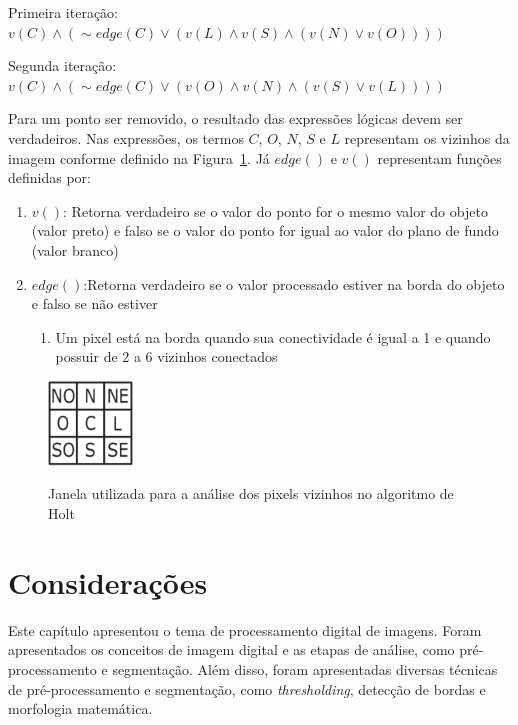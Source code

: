 \documentclass[12pt,oneside,a4paper,english,french,spanish,brazil,]{abntex2}
\begin{document}
Primeira iteração: 
\(v(C) \wedge (\sim edge(C) \vee (v(L) \wedge v(S) \wedge (v(N) \vee v(O))))\)

Segunda iteração:
\(v(C) \wedge (\sim edge(C) \vee (v(O) \wedge v(N) \wedge (v(S) \vee v(L))))\)

Para um ponto ser removido, o resultado das expressões lógicas devem ser verdadeiros. Nas expressões, os termos \(C\), \(O\), \(N\), \(S\) e \(L\) representam os vizinhos da imagem conforme definido na Figura~\ref{fig:PDI_Holt_1}. Já \(edge()\) e \(v()\) representam funções definidas por:
\begin{enumerate}
\item \(v()\): Retorna verdadeiro se o valor do ponto for o mesmo valor do objeto (valor preto) e falso se o valor do ponto for igual ao valor do plano de fundo (valor branco)
\item \(edge()\):Retorna verdadeiro se o valor processado estiver na borda do objeto e falso se não estiver
\begin{enumerate}[label*=\roman*.]
    \item Um pixel está na borda quando sua conectividade é igual a 1 e quando possuir de 2 a 6 vizinhos conectados
  \end{enumerate}
\end{enumerate}

\begin{figure}[ht]
\centering
\caption{Janela utilizada para a análise dos pixels vizinhos no algoritmo de Holt}
\includegraphics[width=0.2\textwidth]{imagens/PDI_Holt_1.PNG}
\label{fig:PDI_Holt_1}
\end{figure}

\section{Considerações}

Este capítulo apresentou o tema de processamento digital de imagens. Foram apresentados os conceitos de imagem digital e as etapas de análise, como pré-processamento e segmentação. Além disso, foram apresentadas diversas técnicas de pré-processamento e segmentação, como \textit{thresholding}, detecção de bordas e morfologia matemática.
\end{document}
